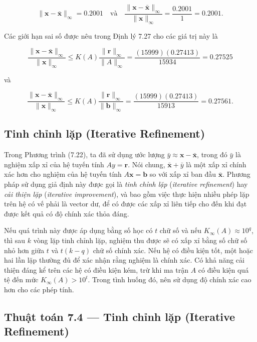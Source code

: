 \[
\|\mathbf{x} - \bar{\mathbf{x}}\|_\infty = 0.2001
\quad \text{và} \quad
\frac{\|\mathbf{x} - \bar{\mathbf{x}}\|_\infty}{\|\mathbf{x}\|_\infty}
= \frac{0.2001}{1} = 0.2001.
\]

Các giới hạn sai số được nêu trong Định lý 7.27 cho các giá trị này là

\[
\frac{\|\mathbf{x} - \bar{\mathbf{x}}\|_\infty}{\|\mathbf{x}\|_\infty}
\leq K(A) \frac{\|\mathbf{r}\|_\infty}{\|A\|_\infty}
= \frac{(15999)(0.27413)}{15934} = 0.27525
\]

và

\[
\frac{\|\mathbf{x} - \bar{\mathbf{x}}\|_\infty}{\|\mathbf{x}\|_\infty}
\leq K(A) \frac{\|\mathbf{r}\|_\infty}{\|\mathbf{b}\|_\infty}
= \frac{(15999)(0.27413)}{15913} = 0.27561.
\]

\subsection{Tinh chỉnh lặp (Iterative Refinement)}

Trong Phương trình (7.22), ta đã sử dụng ước lượng $\bar{y} \approx \mathbf{x} - \bar{\mathbf{x}}$, trong đó $\bar{y}$ là nghiệm xấp xỉ của hệ tuyến tính $A y = \mathbf{r}$.  
Nói chung, $\bar{\mathbf{x}} + \bar{y}$ là một xấp xỉ chính xác hơn cho nghiệm của hệ tuyến tính $A \mathbf{x} = \mathbf{b}$ so với xấp xỉ ban đầu $\bar{\mathbf{x}}$.  
Phương pháp sử dụng giả định này được gọi là \textit{tinh chỉnh lặp} (\textit{iterative refinement}) hay \textit{cải thiện lặp} (\textit{iterative improvement}), và bao gồm việc thực hiện nhiều phép lặp trên hệ có vế phải là vector dư, để có được các xấp xỉ liên tiếp cho đến khi đạt được kết quả có độ chính xác thỏa đáng.

Nếu quá trình này được áp dụng bằng số học có $t$ chữ số và nếu $K_{\infty}(A) \approx 10^{q}$, thì sau $k$ vòng lặp tinh chỉnh lặp, nghiệm thu được sẽ có xấp xỉ bằng số chữ số nhỏ hơn giữa $t$ và $t(k - q)$ chữ số chính xác.  
Nếu hệ có điều kiện tốt, một hoặc hai lần lặp thường đủ để xác nhận rằng nghiệm là chính xác.  
Có khả năng cải thiện đáng kể trên các hệ có điều kiện kém, trừ khi ma trận $A$ có điều kiện quá tệ đến mức $K_{\infty}(A) > 10^{t}$.  
Trong tình huống đó, nên sử dụng độ chính xác cao hơn cho các phép tính.

\subsection*{Thuật toán 7.4 — Tinh chỉnh lặp (Iterative Refinement)}

